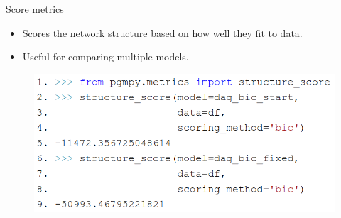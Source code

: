 \documentclass{beamer}
\begin{document}
\begin{frame}{Score metrics}
	\begin{itemize}
		\item Scores the network structure based on how well they fit to data.
		\item Useful for comparing multiple models.
	\end{itemize}
	\vspace{1em}
	\begin{figure}
		\includegraphics[scale=0.3]{imgs/structure_score.png}
	\end{figure}
\end{frame}

% 	
% 
% 
\end{document}
